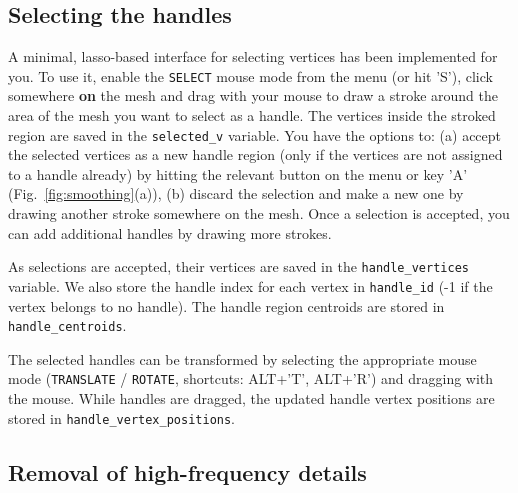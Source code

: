 \documentclass[11pt]{amsart}
\begin{document}
\subsection{Selecting the handles}
A minimal, lasso-based interface for selecting vertices has been implemented for you. To use it, enable the \texttt{SELECT} mouse mode from the menu (or hit 'S'), click somewhere \textbf{on} the mesh and drag with your mouse to draw a stroke around the area of the mesh you want to select as a handle. The vertices inside the stroked region are saved in the \texttt{selected\_v} variable. You have the options to: (a) accept the selected vertices as a new handle region (only if the vertices are not assigned to a handle already) by hitting the relevant button on the menu or key 'A' (Fig.~\ref{fig:smoothing}(a)), (b) discard the selection and make a new one by drawing another stroke somewhere on the mesh. Once a selection is accepted, you can add additional handles by drawing more strokes.

As selections are accepted, their vertices are saved in the \texttt{handle\_vertices} variable. We also store the handle index for each vertex in \texttt{handle\_id} (-1 if the vertex belongs to no handle). The handle region centroids are stored in \texttt{handle\_centroids}.

The selected handles can be transformed by selecting the appropriate mouse mode (\texttt{TRANSLATE} / \texttt{ROTATE}, shortcuts: ALT+'T', ALT+'R') and dragging with the mouse. While handles are dragged, the updated handle vertex positions are stored in \texttt{handle\_vertex\_positions}.

\subsection{Removal of high-frequency details}
\end{document}
